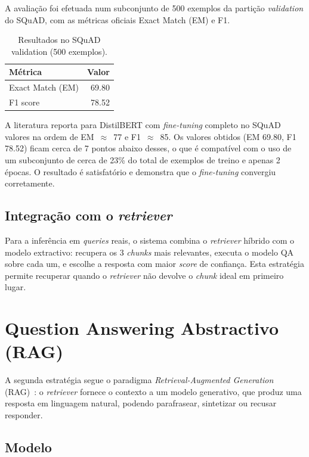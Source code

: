 \documentclass[11pt,a4paper]{article}
\begin{document}
A avaliação foi efetuada num subconjunto de 500 exemplos da partição \emph{validation} do SQuAD, com as métricas oficiais Exact Match (EM) e F1.

\begin{table}[h]
\centering
\begin{tabular}{lr}
\toprule
\textbf{Métrica} & \textbf{Valor} \\
\midrule
Exact Match (EM) & 69.80 \\
F1 score & 78.52 \\
\bottomrule
\end{tabular}
\caption{Resultados no SQuAD validation (500 exemplos).}
\end{table}

A literatura reporta para DistilBERT com \emph{fine-tuning} completo no SQuAD valores na ordem de EM~$\approx$~77 e F1~$\approx$~85. Os valores obtidos (EM 69.80, F1 78.52) ficam cerca de 7 pontos abaixo desses, o que é compatível com o uso de um subconjunto de cerca de 23\% do total de exemplos de treino e apenas 2 épocas. O resultado é satisfatório e demonstra que o \emph{fine-tuning} convergiu corretamente.

\subsection{Integração com o \emph{retriever}}

Para a inferência em \emph{queries} reais, o sistema combina o \emph{retriever} híbrido com o modelo extractivo: recupera os 3 \emph{chunks} mais relevantes, executa o modelo QA sobre cada um, e escolhe a resposta com maior \emph{score} de confiança. Esta estratégia permite recuperar quando o \emph{retriever} não devolve o \emph{chunk} ideal em primeiro lugar.

\section{Question Answering Abstractivo (RAG)}

A segunda estratégia segue o paradigma \emph{Retrieval-Augmented Generation} (RAG)~\cite{rag}: o \emph{retriever} fornece o contexto a um modelo generativo, que produz uma resposta em linguagem natural, podendo parafrasear, sintetizar ou recusar responder.

\subsection{Modelo}
\end{document}

